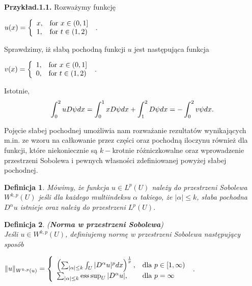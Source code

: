 \documentclass[12pt,a4paper,oneside,titlepage]{article}
\newtheorem{Def}{Definicja}
\DeclareMathOperator*{\esssup}{ess\,sup}
\begin{document}
\textbf{Przykład.1.1.}
Rozważymy funkcję 
\begin{center}
$
u (x)  = \left\{ \begin{array}{ll}
x, & \textrm{for $x \in (0,1]$}\\
1, & \textrm{for $ t \in (1, 2) $} \\
\end{array} \right.
$ .
\end{center}
Sprawdzimy, iż słabą pochodną funkcji $u$ jest następująca funkcja
\begin{center}
$
v (x)  = \left\{ \begin{array}{ll}
1, & \textrm{for $x \in (0,1]$}\\
0, & \textrm{for $ t \in (1, 2) $} \\
\end{array} \right.
$ .
\end{center}
\newpage
Istotnie,
\begin{equation}
\nonumber
\int_0^2 u D\psi dx = \int_0^1 x D\psi dx + \int_1^2 D \psi dx = - \int_0^2 v \psi dx . \\
\end{equation}
\bigskip

Pojęcie słabej pochodnej umożliwia nam rozważanie rezultatów wynikających m.in. ze wzoru na całkowanie przez części oraz pochodną iloczynu również dla funkcji, które niekoniecznie są $k-$krotnie różniczkowalne oraz wprowadzenie przestrzeni Sobolewa i pewnych własności zdefiniowanej powyżej słabej pochodnej.

\begin{Def} Mówimy, że funkcja $u \in L^{p}(U)$ należy do przestrzeni Sobolewa $W^{k,p}(U)$ jeśli dla każdego multiindeksu $\alpha$ takiego, że $\vert \alpha \vert \leq k$, słaba pochodna $D^{\alpha}u$ istnieje oraz należy do przestrzeni $L^{p}(U)$.
\end{Def}

\begin{Def} (\textbf{Norma w przestrzeni Sobolewa}) \\  Jeśli $u \in W^{k,p}(U)$, definiujemy normę w przestrzeni Sobolewa następujący sposób
\begin{center}
$
\Vert u \Vert_{W^{k,p}(u)}  = \left\{ \begin{array}{ll}
 \left( \sum_{\vert \alpha \vert \leq k } \int_{U} \vert D^{\alpha} u \vert^{p} dx\right)^{\frac{1}{p}}, & \textrm{dla $p \in [1,\infty)$}\\
\sum_{\vert \alpha \vert \leq k} \esssup_{U} \vert D^{\alpha} u \vert, & \textrm{dla $ p = \infty $} \\
\end{array} \right.
$ .
\end{center}
\end{Def}
\end{document}
